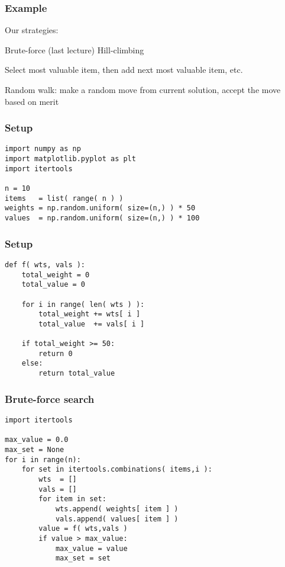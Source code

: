 \documentclass[11pt]{beamer}
\begin{document}
\begin{frame}[fragile]
  \frametitle{Example}
  \Enlarge

  \begin{enumerate}
  \myitem  Our strategies:
    \begin{enumerate}
    \mysubitem  Brute-force (last lecture)
    \mysubitem  Hill-climbing 
      \begin{enumerate}
      \mysubitem  Select most valuable item, then add next most valuable item, etc. 
      \end{enumerate}
    \mysubitem  Random walk:  make a random move from current solution, accept the move based on merit
    \end{enumerate}
  \end{enumerate}
\end{frame}

\begin{frame}[fragile]
  \frametitle{Setup}
  \Enlarge

  \begin{Verbatim}
import numpy as np
import matplotlib.pyplot as plt
import itertools

n = 10
items   = list( range( n ) )
weights = np.random.uniform( size=(n,) ) * 50
values  = np.random.uniform( size=(n,) ) * 100
  \end{Verbatim}
\end{frame}

\begin{frame}[fragile]
  \frametitle{Setup}

  \begin{Verbatim}
def f( wts, vals ):
    total_weight = 0
    total_value = 0

    for i in range( len( wts ) ):
        total_weight += wts[ i ]
        total_value  += vals[ i ]

    if total_weight >= 50:
        return 0
    else:
        return total_value
  \end{Verbatim}
\end{frame}

\begin{frame}[fragile]
  \frametitle{Brute-force search}

  \begin{Verbatim}
import itertools

max_value = 0.0
max_set = None
for i in range(n):
    for set in itertools.combinations( items,i ):
        wts  = []
        vals = []
        for item in set:
            wts.append( weights[ item ] )
            vals.append( values[ item ] )
        value = f( wts,vals )
        if value > max_value:
            max_value = value
            max_set = set
  \end{Verbatim}
\end{frame}
\end{document}
